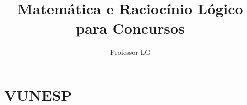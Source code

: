 \documentclass[12pt,a4paper]{report}
\author{Professor LG}
\title{Matemática e Raciocínio Lógico para Concursos}
\begin{document}
\maketitle
\tableofcontents
\chapter{VUNESP}

\end{document}
